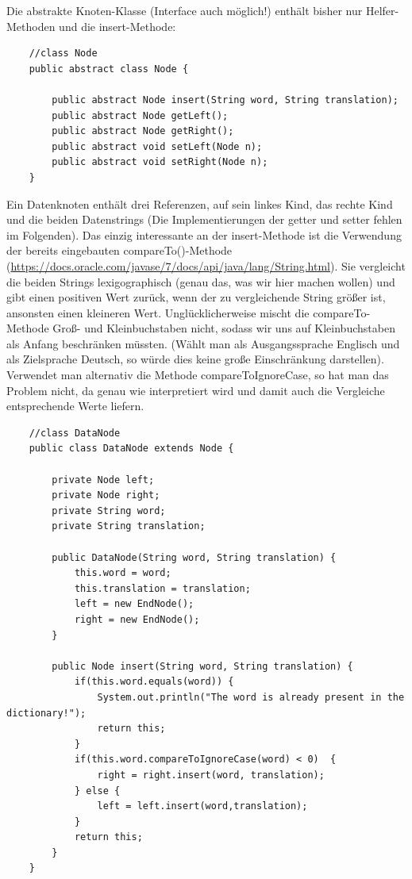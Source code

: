 \documentclass{article}
\begin{document}
Die abstrakte Knoten-Klasse (Interface auch möglich!) enthält bisher nur Helfer-Methoden und die insert-Methode:

\begin{verbatim}
    //class Node 
    public abstract class Node {

        public abstract Node insert(String word, String translation);
        public abstract Node getLeft();
        public abstract Node getRight();
        public abstract void setLeft(Node n);
        public abstract void setRight(Node n);
    }
\end{verbatim}

Ein Datenknoten enthält drei Referenzen, auf sein linkes Kind, das rechte Kind und die beiden Datenstrings (Die Implementierungen der getter und setter fehlen im Folgenden). Das einzig interessante an der insert-Methode ist die Verwendung der bereits eingebauten compareTo()-Methode (\url{https://docs.oracle.com/javase/7/docs/api/java/lang/String.html}). Sie vergleicht die beiden Strings lexigographisch (genau das, was wir hier machen wollen) und gibt einen positiven Wert zurück, wenn der zu vergleichende String größer ist, ansonsten einen kleineren Wert. Unglücklicherweise mischt die compareTo-Methode Groß- und Kleinbuchstaben nicht, sodass wir uns auf Kleinbuchstaben als Anfang beschränken müssten. (Wählt man als Ausgangssprache Englisch und als Zielsprache Deutsch, so würde dies  keine große Einschränkung darstellen). Verwendet man alternativ die Methode compareToIgnoreCase, so hat man das Problem nicht, da  genau wie  interpretiert wird und damit auch die Vergleiche entsprechende Werte liefern. 
\begin{verbatim}
    //class DataNode 
    public class DataNode extends Node {

        private Node left;
        private Node right;
        private String word;
        private String translation;

        public DataNode(String word, String translation) {
            this.word = word;
            this.translation = translation;
            left = new EndNode();
            right = new EndNode();
        }

        public Node insert(String word, String translation) {
            if(this.word.equals(word)) {
                System.out.println("The word is already present in the dictionary!");
                return this;
            }
            if(this.word.compareToIgnoreCase(word) < 0)  {
                right = right.insert(word, translation);
            } else {
                left = left.insert(word,translation);
            }
            return this;
        }
    }
\end{verbatim}
\end{document}
